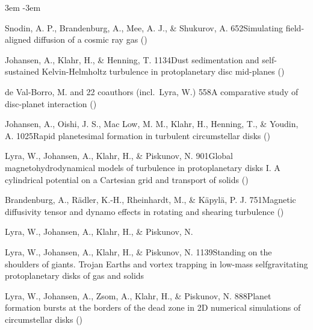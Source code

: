 \documentclass[\mydriver,12pt,twoside,notitlepage,a4paper]{article}
\begin{document}
\begin{list}{}{\leftmargin 3em \itemindent -3em\listparindent \itemindent
\itemsep 0pt \parsep 1pt}
\item
Snodin, A. P., Brandenburg, A., Mee, A. J., \& Shukurov, A.
{652}{Simulating field-aligned diffusion of a cosmic ray gas}
()

\item
Johansen, A., Klahr, H., \& Henning, T.
{1134}{Dust sedimentation and self-sustained Kelvin-Helmholtz turbulence
in protoplanetary disc mid-planes}
()

\item
de Val-Borro, M. and 22 coauthors (incl.\ Lyra, W.)
{558}{A comparative study of disc-planet interaction}
()

\item
Johansen, A., Oishi, J. S., Mac Low, M. M., Klahr, H., Henning, T.,
\& Youdin, A.
{1025}{Rapid planetesimal formation in turbulent circumstellar disks}
()

\item
Lyra, W., Johansen, A., Klahr, H., \& Piskunov, N.
{901}{Global magnetohydrodynamical models of turbulence in protoplanetary disks I. A cylindrical potential on a Cartesian grid and transport of solids}
()

\item
Brandenburg, A., R\"adler, K.-H., Rheinhardt, M., \& K\"apyl\"a, P. J.
{751}{Magnetic diffusivity tensor and dynamo effects in rotating
and shearing turbulence}
()

\item
Lyra, W., Johansen, A., Klahr, H., \& Piskunov, N.

\item
Lyra, W., Johansen, A., Klahr, H., \& Piskunov, N.
{1139}{Standing on the shoulders of giants. Trojan Earths and vortex trapping in low-mass selfgravitating protoplanetary disks of gas and solids}

\item
Lyra, W., Johansen, A., Zsom, A., Klahr, H., \& Piskunov, N.
{888}{Planet formation bursts at the borders of the dead zone in 2D numerical simulations of circumstellar disks}
()


\end{list}
\end{document}
